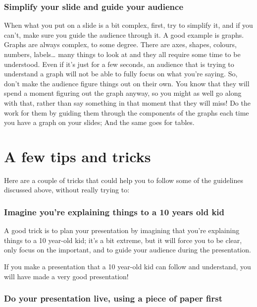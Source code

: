 \documentclass[
  titlepage]{book}
\begin{document}
\hypertarget{simplify-your-slide-and-guide-your-audience}{%
\subsubsection{Simplify your slide and guide your audience}\label{simplify-your-slide-and-guide-your-audience}}

When what you put on a slide is a bit complex, first, try to simplify it, and if you can't, make sure you guide the audience through it. A good example is graphs. Graphs are always complex, to some degree. There are axes, shapes, colours, numbers, labels\ldots{} many things to look at and they all require some time to be understood. Even if it's just for a few seconds, an audience that is trying to understand a graph will not be able to fully focus on what you're saying. So, don't make the audience figure things out on their own. You know that they will spend a moment figuring out the graph anyway, so you might as well go along with that, rather than say something in that moment that they will miss! Do the work for them by guiding them through the components of the graphs each time you have a graph on your slides; And the same goes for tables.

\hypertarget{a-few-tips-and-tricks}{%
\section{A few tips and tricks}\label{a-few-tips-and-tricks}}

Here are a couple of tricks that could help you to follow some of the guidelines discussed above, without really trying to:

\hypertarget{imagine-youre-explaining-things-to-a-10-years-old-kid}{%
\subsubsection{Imagine you're explaining things to a 10 years old kid}\label{imagine-youre-explaining-things-to-a-10-years-old-kid}}

A good trick is to plan your presentation by imagining that you're explaining things to a 10 year-old kid; it's a bit extreme, but it will force you to be clear, only focus on the important, and to guide your audience during the presentation.

If you make a presentation that a 10 year-old kid can follow and understand, you will have made a very good presentation!

\hypertarget{do-your-presentation-live-using-a-piece-of-paper-first}{%
\subsubsection{Do your presentation live, using a piece of paper first}\label{do-your-presentation-live-using-a-piece-of-paper-first}}
\end{document}

